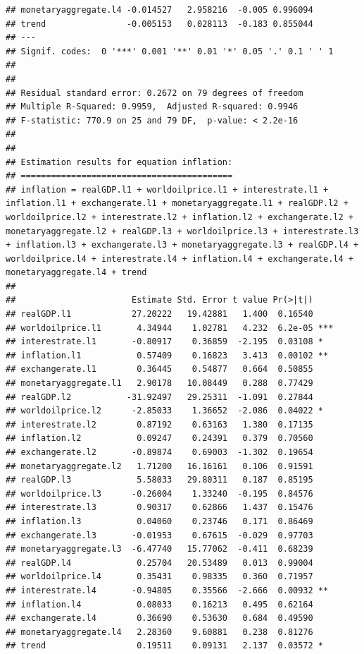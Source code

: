 \documentclass[11pt,preprint, authoryear]{elsarticle}
\numberwithin{equation}{section}
\numberwithin{figure}{section}
\numberwithin{table}{section}
\begin{document}
\begin{verbatim}
## monetaryaggregate.l4 -0.014527   2.958216  -0.005 0.996094    
## trend                -0.005153   0.028113  -0.183 0.855044    
## ---
## Signif. codes:  0 '***' 0.001 '**' 0.01 '*' 0.05 '.' 0.1 ' ' 1
## 
## 
## Residual standard error: 0.2672 on 79 degrees of freedom
## Multiple R-Squared: 0.9959,  Adjusted R-squared: 0.9946 
## F-statistic: 770.9 on 25 and 79 DF,  p-value: < 2.2e-16 
## 
## 
## Estimation results for equation inflation: 
## ========================================== 
## inflation = realGDP.l1 + worldoilprice.l1 + interestrate.l1 + inflation.l1 + exchangerate.l1 + monetaryaggregate.l1 + realGDP.l2 + worldoilprice.l2 + interestrate.l2 + inflation.l2 + exchangerate.l2 + monetaryaggregate.l2 + realGDP.l3 + worldoilprice.l3 + interestrate.l3 + inflation.l3 + exchangerate.l3 + monetaryaggregate.l3 + realGDP.l4 + worldoilprice.l4 + interestrate.l4 + inflation.l4 + exchangerate.l4 + monetaryaggregate.l4 + trend 
## 
##                       Estimate Std. Error t value Pr(>|t|)    
## realGDP.l1            27.20222   19.42881   1.400  0.16540    
## worldoilprice.l1       4.34944    1.02781   4.232  6.2e-05 ***
## interestrate.l1       -0.80917    0.36859  -2.195  0.03108 *  
## inflation.l1           0.57409    0.16823   3.413  0.00102 ** 
## exchangerate.l1        0.36445    0.54877   0.664  0.50855    
## monetaryaggregate.l1   2.90178   10.08449   0.288  0.77429    
## realGDP.l2           -31.92497   29.25311  -1.091  0.27844    
## worldoilprice.l2      -2.85033    1.36652  -2.086  0.04022 *  
## interestrate.l2        0.87192    0.63163   1.380  0.17135    
## inflation.l2           0.09247    0.24391   0.379  0.70560    
## exchangerate.l2       -0.89874    0.69003  -1.302  0.19654    
## monetaryaggregate.l2   1.71200   16.16161   0.106  0.91591    
## realGDP.l3             5.58033   29.80311   0.187  0.85195    
## worldoilprice.l3      -0.26004    1.33240  -0.195  0.84576    
## interestrate.l3        0.90317    0.62866   1.437  0.15476    
## inflation.l3           0.04060    0.23746   0.171  0.86469    
## exchangerate.l3       -0.01953    0.67615  -0.029  0.97703    
## monetaryaggregate.l3  -6.47740   15.77062  -0.411  0.68239    
## realGDP.l4             0.25704   20.53489   0.013  0.99004    
## worldoilprice.l4       0.35431    0.98335   0.360  0.71957    
## interestrate.l4       -0.94805    0.35566  -2.666  0.00932 ** 
## inflation.l4           0.08033    0.16213   0.495  0.62164    
## exchangerate.l4        0.36690    0.53630   0.684  0.49590    
## monetaryaggregate.l4   2.28360    9.60881   0.238  0.81276    
## trend                  0.19511    0.09131   2.137  0.03572 *  

\end{verbatim}
\end{document}
